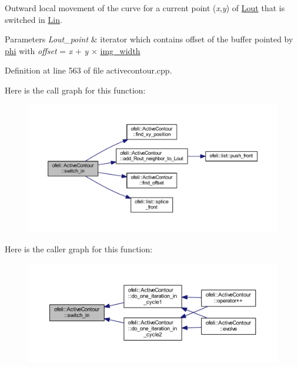 Outward local movement of the curve for a current point ({\itshape x},{\itshape y}) of \hyperlink{classofeli_1_1_active_contour_a31e0eb18a7ea6ae90acf66ed018fcd85}{Lout} that is switched in \hyperlink{classofeli_1_1_active_contour_a7662d4f5c8b87d3e642b08b7e341bd79}{Lin}. 


\begin{DoxyParams}{Parameters}
{\em Lout\-\_\-point} & iterator which contains offset of the buffer pointed by \hyperlink{classofeli_1_1_active_contour_aacb03a6ded4ca51cb52f58aeff955ef7}{phi} with {\itshape offset} = {\itshape x} + {\itshape y} × \hyperlink{classofeli_1_1_active_contour_a3623de7ebc0d27ba7fac21a5929afbc6}{img\-\_\-width} \\
\hline
\end{DoxyParams}


Definition at line 563 of file activecontour.\-cpp.



Here is the call graph for this function\-:\nopagebreak
\begin{figure}[H]
\begin{center}
\leavevmode
\includegraphics[width=350pt]{classofeli_1_1_active_contour_a7d9a557b580af708155ff4ab8bbfd73b_cgraph}
\end{center}
\end{figure}




Here is the caller graph for this function\-:\nopagebreak
\begin{figure}[H]
\begin{center}
\leavevmode
\includegraphics[width=350pt]{classofeli_1_1_active_contour_a7d9a557b580af708155ff4ab8bbfd73b_icgraph}
\end{center}
\end{figure}


